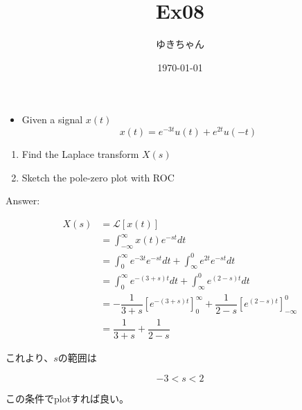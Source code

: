 \documentclass[a4paper,16pt]{jsarticle}
\title{Ex08}
\author{ゆきちゃん}
\date{\today}
\begin{document}
\maketitle

\begin{itemize}
	\item Given a signal $x(t)$
	\begin{equation}
		x(t) = e^{-3t}u(t) + e^{2t}u(-t)
	\end{equation}
\end{itemize}

\begin{enumerate}
	\item Find the Laplace transform $X(s)$
	\item Sketch the pole-zero plot with ROC
\end{enumerate}

Answer:

\begin{align}
	X(s) &= \mathcal{L}[x(t)] \\
	&= \int_{-\infty}^\infty x(t) e^{-st} dt \\
	&= \int_0^\infty e^{-3t}e^{-st} dt + \int_{\infty}^0 e^{2t}e^{-st}dt \\
	&= \int_0^\infty e^{-(3+s)t} dt + \int_{\infty}^0 e^{(2-s)t}dt \\
	&= -\dfrac{1}{3+s}[e^{-(3+s)t}]_0^\infty + \dfrac{1}{2-s}[e^{(2-s)t}]_{-\infty}^0 \\
	&= \dfrac{1}{3+s} + \dfrac{1}{2-s}
\end{align}

これより、$s$の範囲は

\begin{equation}
	-3 < s < 2
\end{equation}

この条件でplotすれば良い。
\end{document}
